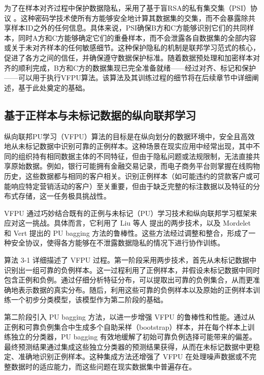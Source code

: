 为了在样本对齐过程中保护数据隐私，采用了基于盲RSA的私有集交集（PSI）协议 \citep{de2010practical}。这种密码学技术使所有方能够安全地计算其数据集的交集，而不会暴露除共享样本ID之外的任何信息。具体来说，PSI确保B方和C方能够识别它们的共同样本，同时A方和C方能够确定它们的重叠样本，而不会泄露各自数据集的全部内容或关于未对齐样本的任何敏感细节。这种保护隐私的机制是联邦学习范式的核心，促进了各方之间的信任，并确保遵守数据保护标准。随着数据预处理和加密样本对齐的顺利完成，B方和C方的数据集现已完全准备就绪——经过对齐、标记和保护——可以用于执行VFPU算法。该算法及其训练过程的细节将在后续章节中详细阐述，基于此处奠定的基础。


\subsection{基于正样本与未标记数据的纵向联邦学习}
纵向联邦PU学习（VFPU）算法的目标是在纵向划分的数据环境中，安全且高效地从未标记数据中识别可靠的正例样本。这种场景在现实应用中经常出现，其中不同的组织持有相同数据主体的不同特征，但由于隐私问题或法规限制，无法直接共享原始数据。例如，银行可能拥有金融交易记录，而电子商务平台则掌握在线购物历史，这些数据都与相同的客户相关。识别正例样本（如可能违约的贷款客户或可能响应特定营销活动的客户）至关重要，但由于缺乏完整的标注数据以及特征的分布式存储，这一任务极具挑战性。

VFPU 通过巧妙结合既有的正例与未标记（PU）学习技术和纵向联邦学习框架来应对这一挑战。具体而言，它利用了 Liu 等人 \citep{liu2003building} 提出的两步技术，以及 Mordelet 和 Vert \citep{mordelet2014bagging} 提出的 PU bagging 方法的鲁棒性。这些方法经过调整和整合，形成了一种安全协议，使得各方能够在不泄露数据隐私的情况下进行协作训练。

算法 3-1 详细描述了 VFPU 过程。第一阶段采用两步技术，首先从未标记数据中识别出一组可靠的负例样本。这一过程利用了正例样本，并假设未标记数据中同时包含正例和负例。通过仔细分析特征分布，可以提取出可靠的负例集合，从而更准确地表示数据的真实分布。随后，利用这些可靠的负例样本以及原始的正例样本训练一个初步分类模型，该模型作为第二阶段的基础。


第二阶段引入 PU bagging 方法，以进一步增强 VFPU 的鲁棒性和性能。通过从正例和可靠负例集合中生成多个自助采样（bootstrap）样本，并在每个样本上训练独立的分类器，PU bagging 有效地缓解了初始可靠负例选择可能带来的偏差。最终预测结果通过集成这些独立分类器的预测结果获得，从而在未标记数据中更稳定、准确地识别正例样本。这种集成方法还增强了 VFPU 在处理噪声数据或不完整数据时的适应能力，而这些问题在现实数据集中普遍存在。

